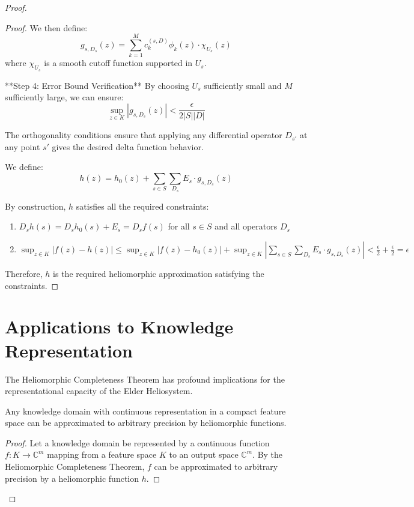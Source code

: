 \begin{proof}
\begin{proof}
We then define:
$$g_{s,D_s}(z) = \sum_{k=1}^{M} c_k^{(s,D)} \phi_k(z) \cdot \chi_{U_s}(z)$$
where $\chi_{U_s}$ is a smooth cutoff function supported in $U_s$.

**Step 4: Error Bound Verification**
By choosing $U_s$ sufficiently small and $M$ sufficiently large, we can ensure:
$$\sup_{z \in K} |g_{s,D_s}(z)| < \frac{\epsilon}{2|S||D|}$$

The orthogonality conditions ensure that applying any differential operator $D_{s'}$ at any point $s'$ gives the desired delta function behavior.

We define:
\begin{equation}
h(z) = h_0(z) + \sum_{s \in S}\sum_{D_s} E_s \cdot g_{s,D_s}(z)
\end{equation}

By construction, $h$ satisfies all the required constraints:
\begin{enumerate}
    \item $D_sh(s) = D_sh_0(s) + E_s = D_sf(s)$ for all $s \in S$ and all operators $D_s$
    \item $\sup_{z \in K} |f(z) - h(z)| \leq \sup_{z \in K} |f(z) - h_0(z)| + \sup_{z \in K} \left|\sum_{s \in S}\sum_{D_s} E_s \cdot g_{s,D_s}(z)\right| < \frac{\epsilon}{2} + \frac{\epsilon}{2} = \epsilon$
\end{enumerate}

Therefore, $h$ is the required heliomorphic approximation satisfying the constraints.
\end{proof}

\section{Applications to Knowledge Representation}

The Heliomorphic Completeness Theorem has profound implications for the representational capacity of the Elder Heliosystem.

\begin{corollary}
Any knowledge domain with continuous representation in a compact feature space can be approximated to arbitrary precision by heliomorphic functions.
\end{corollary}

\begin{proof}
Let a knowledge domain be represented by a continuous function $f: K \rightarrow \mathbb{C}^m$ mapping from a feature space $K$ to an output space $\mathbb{C}^m$. By the Heliomorphic Completeness Theorem, $f$ can be approximated to arbitrary precision by a heliomorphic function $h$.


\end{proof}
\end{proof}
